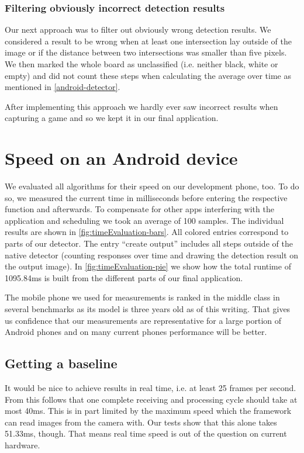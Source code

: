 	\subsubsection{Filtering obviously incorrect detection results}
	\label{evaluation-prepostprocessing-filteringOutliers-filteringWrong}
	Our next approach was to filter out obviously wrong detection results. We considered a result to be wrong when at least one intersection lay outside of the image or if the distance between two intersections was smaller than five pixels. We then marked the whole board as unclassified (i.e. neither black, white or empty) and did not count these steps when calculating the average over time as mentioned in \autoref{android-detector}.

	After implementing this approach we hardly ever saw incorrect results when capturing a game and so we kept it in our final application.






	\section{Speed on an Android device}
	\label{evaluation-speed}
	We evaluated all algorithms for their speed on our development phone, too. To do so, we measured the current time in milliseconds before entering the respective function and afterwards. To compensate for other apps interfering with the application and scheduling we took an average of 100 samples. The individual results are shown in \autoref{fig:timeEvaluation-bars}. All colored entries correspond to parts of our detector. The entry ``create output'' includes all steps outside of the native detector (counting responses over time and drawing the detection result on the output image). In \autoref{fig:timeEvaluation-pie} we show how the total runtime of 1095.84ms is built from the different parts of our final application.

	The mobile phone we used for measurements is ranked in the middle class in several benchmarks\cite{antutuBench,primateBench} as its model is three years old as of this writing. That gives us confidence that our measurements are representative for a large portion of Android phones and on many current phones performance will be better.

	\subsection{Getting a baseline}
	\label{evaluation-speed-baseline}
	It would be nice to achieve results in real time, i.e. at least 25 frames per second. From this follows that one complete receiving and processing cycle should take at most 40ms. This is in part limited by the maximum speed which the framework can read images from the camera with. Our tests show that this alone takes 51.33ms, though. That means real time speed is out of the question on current hardware.

